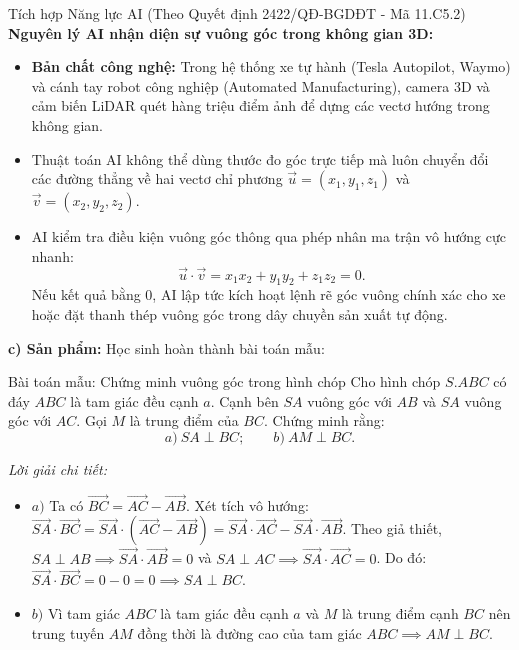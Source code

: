 \documentclass[12pt, a4paper]{article}
\renewcommand{\vec}[1]{\overrightarrow{#1}}
\begin{document}
\begin{aibox}{Tích hợp Năng lực AI (Theo Quyết định 2422/QĐ-BGDĐT - Mã 11.C5.2)}
\textbf{Nguyên lý AI nhận diện sự vuông góc trong không gian 3D:}
\begin{itemize}[leftmargin=0.6cm]
    \item \textbf{Bản chất công nghệ:} Trong hệ thống xe tự hành (Tesla Autopilot, Waymo) và cánh tay robot công nghiệp (Automated Manufacturing), camera 3D và cảm biến LiDAR quét hàng triệu điểm ảnh để dựng các vectơ hướng trong không gian.
    \item Thuật toán AI không thể dùng thước đo góc trực tiếp mà luôn chuyển đổi các đường thẳng về hai vectơ chỉ phương $\vec{u} = (x_1, y_1, z_1)$ và $\vec{v} = (x_2, y_2, z_2)$.
    \item AI kiểm tra điều kiện vuông góc thông qua phép nhân ma trận vô hướng cực nhanh:
    $$\vec{u} \cdot \vec{v} = x_1 x_2 + y_1 y_2 + z_1 z_2 = 0.$$
    Nếu kết quả bằng $0$, AI lập tức kích hoạt lệnh rẽ góc vuông chính xác cho xe hoặc đặt thanh thép vuông góc trong dây chuyền sản xuất tự động.
\end{itemize}
\end{aibox}

\noindent \textbf{c) Sản phẩm:}
Học sinh hoàn thành bài toán mẫu:
\begin{pedabox}{Bài toán mẫu: Chứng minh vuông góc trong hình chóp}
Cho hình chóp $S.ABC$ có đáy $ABC$ là tam giác đều cạnh $a$. Cạnh bên $SA$ vuông góc với $AB$ và $SA$ vuông góc với $AC$. Gọi $M$ là trung điểm của $BC$. Chứng minh rằng:
$$a) \ SA \perp BC; \qquad b) \ AM \perp BC.$$
\end{pedabox}
\textit{Lời giải chi tiết:}
\begin{itemize}
    \item $a)$ Ta có $\vec{BC} = \vec{AC} - \vec{AB}$.
    Xét tích vô hướng: $\vec{SA} \cdot \vec{BC} = \vec{SA} \cdot (\vec{AC} - \vec{AB}) = \vec{SA} \cdot \vec{AC} - \vec{SA} \cdot \vec{AB}$.
    Theo giả thiết, $SA \perp AB \implies \vec{SA} \cdot \vec{AB} = 0$ và $SA \perp AC \implies \vec{SA} \cdot \vec{AC} = 0$.
    Do đó: $\vec{SA} \cdot \vec{BC} = 0 - 0 = 0 \implies SA \perp BC$.
    \item $b)$ Vì tam giác $ABC$ là tam giác đều cạnh $a$ và $M$ là trung điểm cạnh $BC$ nên trung tuyến $AM$ đồng thời là đường cao của tam giác $ABC \implies AM \perp BC$.
\end{itemize}
\end{document}
